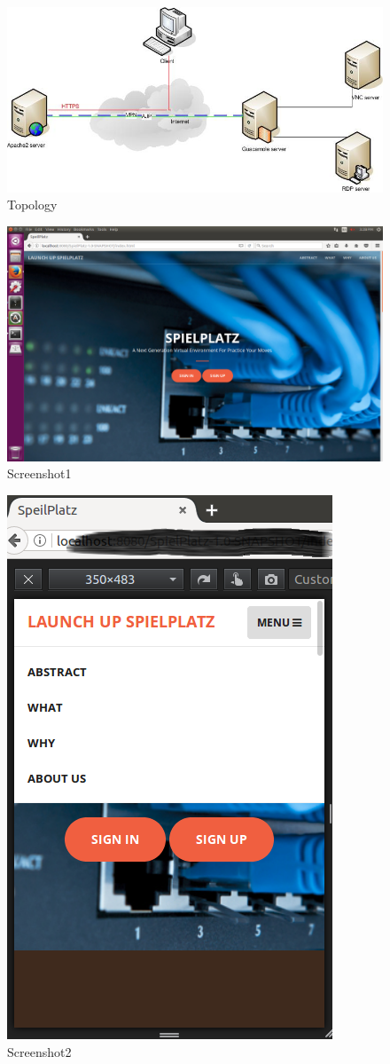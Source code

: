 \documentclass[12pt,a4paper,final,oneside]{report}
\begin{document}
	\noindent \begin{figure}[h!]
		\centering \includegraphics[width=0.685\linewidth,angle=0]{topology2.jpg}
	\caption{Topology}
	\end{figure}
	\noindent \begin{figure}[h!]
		\centering \includegraphics[width=0.685\linewidth,angle=0]{Screenshot1.png}
	\caption{Screenshot1}
	\end{figure}
	\noindent \begin{figure}[h!]
		\centering \includegraphics[width=0.685\linewidth,angle=0]{Screenshot2.png}
	\caption{Screenshot2}
	\end{figure}
\end{document}
